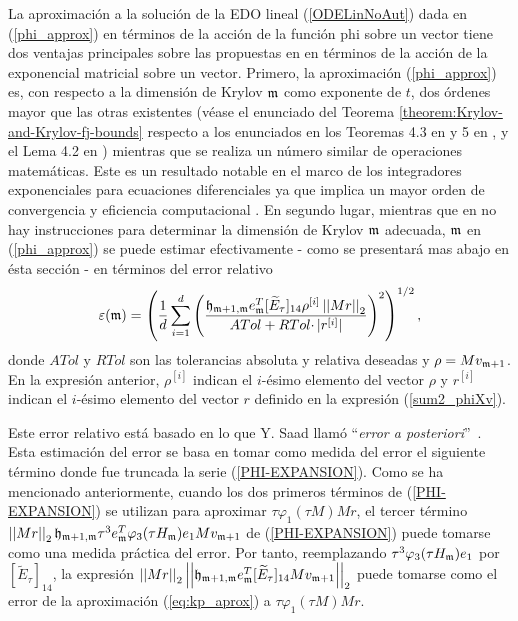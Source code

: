 La aproximación a la solución de la EDO lineal (\ref{ODELinNoAut}) dada en (\ref{phi_approx}) en términos de la acción de la función phi sobre un vector tiene dos ventajas principales sobre las propuestas en \cite{hochbruck1997krylov,sidje1998expokit,jimenez2012convergence}
en términos de la acción de la exponencial matricial sobre un vector. Primero, la aproximación (\ref{phi_approx}) es, con respecto a la dimensión de Krylov $\mathfrak{m}$ como exponente de $t$, dos órdenes mayor que las otras existentes (véase el enunciado del Teorema \ref{theorem:Krylov-and-Krylov-fj-bounds} respecto a los enunciados en los Teoremas 4.3 en \cite{Saad92} y 5 en \cite{hochbruck1997krylov}, y el Lema 4.2 en \cite{jimenez2012convergence}) mientras que se realiza un número similar de operaciones matemáticas. Este es un resultado notable en el marco de los integradores exponenciales para ecuaciones diferenciales ya que implica un mayor orden de convergencia y eficiencia computacional \cite{naranjo2021locally}. En segundo lugar, mientras que en \cite{hochbruck1997krylov,sidje1998expokit,jimenez2012convergence} no hay instrucciones para determinar la dimensión de Krylov $\mathfrak{m}$ adecuada, $\mathfrak{m}$ en (\ref{phi_approx}) se puede estimar efectivamente - como se presentará mas abajo en ésta sección - en términos del error relativo
\begin{equation*}
\varepsilon(\mathfrak{m}) = \left(\frac{1}{d}\sum\limits_{i=1}^{d} \left(\frac{
	\mathfrak{h}_{\mathfrak{m}+1,\mathfrak{m}} e_{\mathfrak{m}}^T
	[\widetilde{E}_\tau]_{14} \rho^{[i]} \left\lvert \left\lvert Mr \right\rvert \right\rvert_2}{ATol+ RTol\cdotp
	\rvert r^{[i]}\rvert}\right)^{2}\right)^{1/2},
\end{equation*}
donde $ATol$ y $RTol$ son las tolerancias absoluta y relativa deseadas y $\rho = M v_{\mathfrak{m}+1}$. En la expresión anterior, $\rho^{[i]}$ indican el $i$-ésimo elemento del vector $\rho$ y $r^{[i]}$  indican el $i$-ésimo elemento del vector $r$ definido en la expresión (\ref{sum2_phiXv}).

Este error relativo está basado en lo que Y. Saad llamó ``\textit{error a posteriori}''~\cite{Saad92}. Esta estimación del error se basa en tomar como medida del error el siguiente término donde fue truncada la serie (\ref{PHI-EXPANSION}). Como se ha mencionado anteriormente, cuando los dos primeros términos de (\ref{PHI-EXPANSION}) se utilizan para aproximar $\tau\varphi_1(\tau M)Mr$, el tercer término $\left\lvert\left\lvert Mr \right\rvert\right\rvert_2 \mathfrak{h}_{\mathfrak{m}+1,\mathfrak{m}} \tau^{3} e_{\mathfrak{m}}^{T}\varphi_3( \tau H_{\mathfrak{m}})e_1 M v_{\mathfrak{m}+1} $ de (\ref{PHI-EXPANSION}) puede tomarse como una medida práctica del error. Por tanto, reemplazando $\tau^3\varphi_3( \tau H_{\mathfrak{m}})e_1$ por $[\widetilde{E}_{\tau}]_{14}$, la expresión $\left\lvert \left\lvert Mr \right\rvert\right\rvert_2 \left\lvert\left\lvert \mathfrak{h}_{\mathfrak{m}+1,\mathfrak{m}} e_{\mathfrak{m}}^{T}[\widetilde{E}_{\tau}]_{14} M v_{\mathfrak{m}+1} \right\rvert\right\rvert_2$ puede tomarse como el error de la aproximación (\ref{eq:kp_aprox}) a $\tau\varphi_1(\tau M)Mr$.

